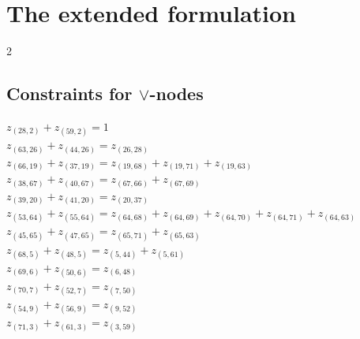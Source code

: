 \documentclass{article}
\begin{document}
\newpage \section{The extended formulation} \begin{multicols*}{2} \noindent
\subsection{Constraints for $\vee$-nodes}
$z_{(28, 2)}+z_{(59, 2)} = 1$\\ 
$z_{(63, 26)}+z_{(44, 26)} = z_{(26, 28)}$\\ 
$z_{(66, 19)}+z_{(37, 19)} = z_{(19, 68)}+z_{(19, 71)}+z_{(19, 63)}$\\ 
$z_{(38, 67)}+z_{(40, 67)} = z_{(67, 66)}+z_{(67, 69)}$\\ 
$z_{(39, 20)}+z_{(41, 20)} = z_{(20, 37)}$\\ 
$z_{(53, 64)}+z_{(55, 64)} = z_{(64, 68)}+z_{(64, 69)}+z_{(64, 70)}+z_{(64, 71)}+z_{(64, 63)}$\\ 
$z_{(45, 65)}+z_{(47, 65)} = z_{(65, 71)}+z_{(65, 63)}$\\ 
$z_{(68, 5)}+z_{(48, 5)} = z_{(5, 44)}+z_{(5, 61)}$\\ 
$z_{(69, 6)}+z_{(50, 6)} = z_{(6, 48)}$\\ 
$z_{(70, 7)}+z_{(52, 7)} = z_{(7, 50)}$\\ 
$z_{(54, 9)}+z_{(56, 9)} = z_{(9, 52)}$\\ 
$z_{(71, 3)}+z_{(61, 3)} = z_{(3, 59)}$

\end{multicols*}
\end{document}
